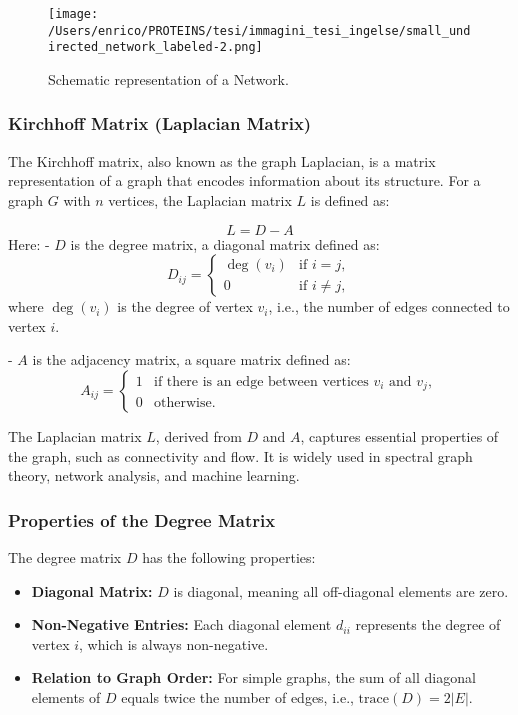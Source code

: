 \documentclass[English, Lau, oneside]{sapthesis}
\begin{document}
\begin{itemize}
\begin{figure}[h]
    \centering
    \texttt{[image: /Users/enrico/PROTEINS/tesi/immagini\_tesi\_ingelse/small\_undirected\_network\_labeled-2.png]}    
    \caption{Schematic representation of a Network.}
    \label{fig:Network}
\end{figure}

\subsubsection{Kirchhoff Matrix (Laplacian Matrix)}
The Kirchhoff matrix, also known as the graph Laplacian, is a matrix representation of a graph that encodes information about its structure. For a graph \( G \) with \( n \) vertices, the Laplacian matrix \( L \) is defined as:

\begin{equation}
    L = D - A \label{Kirchhoff}
\end{equation}
Here:
- \( D \) is the degree matrix, a diagonal matrix defined as:
\begin{equation}
    D_{ij} = 
    \begin{cases} 
      \deg(v_i) & \text{if } i = j, \\
      0 & \text{if } i \neq j,
    \end{cases}
\end{equation}
where \( \deg(v_i) \) is the degree of vertex \( v_i \), i.e., the number of edges connected to vertex \( i \).

- \( A \) is the adjacency matrix, a square matrix defined as:
\begin{equation}
    A_{ij} = 
    \begin{cases} 
      1 & \text{if there is an edge between vertices } v_i \text{ and } v_j, \\
      0 & \text{otherwise}.
    \end{cases}
\end{equation}

The Laplacian matrix \( L \), derived from \( D \) and \( A \), captures essential properties of the graph, such as connectivity and flow. It is widely used in spectral graph theory, network analysis, and machine learning.
\subsubsection{Properties of the Degree Matrix}
The degree matrix \( D \) has the following properties:
\begin{itemize}
    \item \textbf{Diagonal Matrix:} \( D \) is diagonal, meaning all off-diagonal elements are zero.
    \item \textbf{Non-Negative Entries:} Each diagonal element \( d_{ii} \) represents the degree of vertex \( i \), which is always non-negative.
    \item \textbf{Relation to Graph Order:} For simple graphs, the sum of all diagonal elements of \( D \) equals twice the number of edges, i.e., \( \mathrm{trace}(D) = 2|E| \).
\end{itemize}


\end{itemize}
\end{document}
